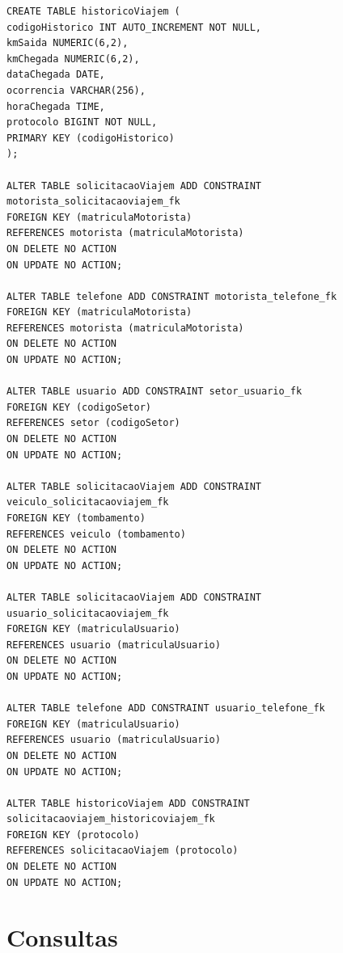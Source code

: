 \documentclass[11pt]{article}
\begin{document}
\begin{verbatim}
CREATE TABLE historicoViajem (
codigoHistorico INT AUTO_INCREMENT NOT NULL,
kmSaida NUMERIC(6,2),
kmChegada NUMERIC(6,2),
dataChegada DATE,
ocorrencia VARCHAR(256),
horaChegada TIME,
protocolo BIGINT NOT NULL,
PRIMARY KEY (codigoHistorico)
);

ALTER TABLE solicitacaoViajem ADD CONSTRAINT motorista_solicitacaoviajem_fk
FOREIGN KEY (matriculaMotorista)
REFERENCES motorista (matriculaMotorista)
ON DELETE NO ACTION
ON UPDATE NO ACTION;

ALTER TABLE telefone ADD CONSTRAINT motorista_telefone_fk
FOREIGN KEY (matriculaMotorista)
REFERENCES motorista (matriculaMotorista)
ON DELETE NO ACTION
ON UPDATE NO ACTION;

ALTER TABLE usuario ADD CONSTRAINT setor_usuario_fk
FOREIGN KEY (codigoSetor)
REFERENCES setor (codigoSetor)
ON DELETE NO ACTION
ON UPDATE NO ACTION;

ALTER TABLE solicitacaoViajem ADD CONSTRAINT veiculo_solicitacaoviajem_fk
FOREIGN KEY (tombamento)
REFERENCES veiculo (tombamento)
ON DELETE NO ACTION
ON UPDATE NO ACTION;

ALTER TABLE solicitacaoViajem ADD CONSTRAINT usuario_solicitacaoviajem_fk
FOREIGN KEY (matriculaUsuario)
REFERENCES usuario (matriculaUsuario)
ON DELETE NO ACTION
ON UPDATE NO ACTION;

ALTER TABLE telefone ADD CONSTRAINT usuario_telefone_fk
FOREIGN KEY (matriculaUsuario)
REFERENCES usuario (matriculaUsuario)
ON DELETE NO ACTION
ON UPDATE NO ACTION;

ALTER TABLE historicoViajem ADD CONSTRAINT solicitacaoviajem_historicoviajem_fk
FOREIGN KEY (protocolo)
REFERENCES solicitacaoViajem (protocolo)
ON DELETE NO ACTION
ON UPDATE NO ACTION;

\end{verbatim}

\section{Consultas}
\end{document}
